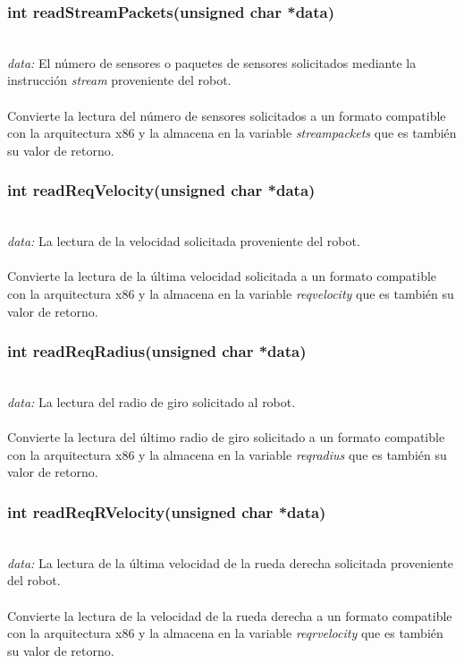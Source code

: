 \documentclass[letterpaper]{book}
\begin{document}
\subsubsection{int readStreamPackets(unsigned char *data)}\mbox{}\\
\emph{data: }El número de sensores o paquetes de sensores solicitados mediante la instrucción \emph{stream} proveniente del robot.\\\\
Convierte la lectura del número de sensores solicitados a un formato compatible con la arquitectura x86 y la almacena en la variable \emph{streampackets} que es también su valor de retorno.\\ 

\subsubsection{int readReqVelocity(unsigned char *data)}\mbox{}\\
\emph{data: }La lectura de la velocidad solicitada proveniente del robot.\\\\
Convierte la lectura de la última velocidad solicitada a un formato compatible con la arquitectura x86 y la almacena en la variable \emph{reqvelocity} que es también su valor de retorno.\\ 

\subsubsection{int readReqRadius(unsigned char *data)}\mbox{}\\
\emph{data: }La lectura del radio de giro solicitado al robot.\\\\
Convierte la lectura del último radio de giro solicitado a un formato compatible con la arquitectura x86 y la almacena en la variable \emph{reqradius} que es también su valor de retorno.\\ 

\subsubsection{int readReqRVelocity(unsigned char *data)}\mbox{}\\
\emph{data: }La lectura de la última velocidad de la rueda derecha solicitada proveniente del robot.\\\\
Convierte la lectura de la velocidad de la rueda derecha a un formato compatible con la arquitectura x86 y la almacena en la variable \emph{reqrvelocity} que es también su valor de retorno.\\ 
\end{document}
